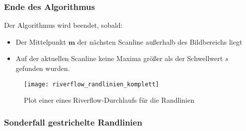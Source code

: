 \subsubsection{Ende des Algorithmus}
Der Algorithmus wird beendet, sobald:
\begin{itemize}
\item Der Mittelpunkt \begin{math} \boldsymbol{m}  \end{math} der nächsten Scanline außerhalb des Bildbereichs liegt
\item Auf der aktuellen Scanline keine Maxima größer als der Schwellwert \begin{math} s \end{math} gefunden wurden.
\end{itemize}

\begin{figure}[htb]
  \centering
  \texttt{[image: riverflow\_randlinien\_komplett]}
  \caption{Plot einer eines Riverflow-Durchlaufs für die Randlinien}
  \label{fig:riverflow:randlinien:plot_komplett}
\end{figure}

\subsubsection{Sonderfall gestrichelte Randlinien}
